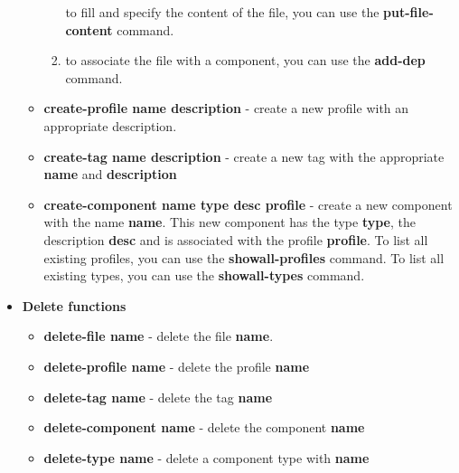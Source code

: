\documentclass[11pt]{book}
\begin{document}
\begin{itemize}
\begin{itemize}
\begin{enumerate}
                  to fill and specify the content of the file,
                  you can use the \textbf{put-file-content} command.
               \item
                  to associate the file with a component, you can use the
                  \textbf{add-dep} command.
            \end{enumerate}
         \item
            \textbf{create-profile name description} - create a new profile with
            an appropriate description.
         \item
            \textbf{create-tag name description} - create a new tag with the
            appropriate \textbf{name} and \textbf{description}
         \item
            \textbf{create-component name type desc profile} - create a new component
            with the name \textbf{name}. This new component has the type
            \textbf{type}, the description \textbf{desc} and is associated with
            the profile \textbf{profile}. To list all existing profiles, you can
            use the \textbf{showall-profiles} command. To list all existing
            types, you can use the \textbf{showall-types} command.
      \end{itemize}
   \item
      \textbf{Delete functions}
      \begin{itemize}
         \item
            \textbf{delete-file name} - delete the file \textbf{name}.
         \item
            \textbf{delete-profile name} - delete the profile \textbf{name}
         \item
            \textbf{delete-tag name} - delete the tag \textbf{name}
         \item
            \textbf{delete-component name} - delete the component \textbf{name}
         \item
            \textbf{delete-type name} - delete a component type with \textbf{name}
      \end{itemize}


\end{itemize}
\end{document}
